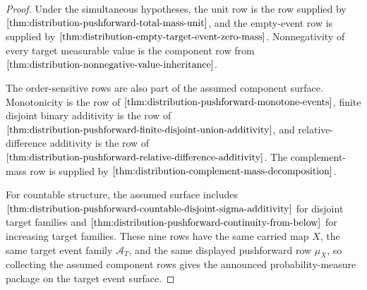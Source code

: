 \begin{proof}
Under the simultaneous hypotheses, the unit row is the row supplied by $\autoref{thm:distribution-pushforward-total-mass-unit}$, and the empty-event row is supplied by $\autoref{thm:distribution-empty-target-event-zero-mass}$. Nonnegativity of every target measurable value is the component row from $\autoref{thm:distribution-nonnegative-value-inheritance}$.

The order-sensitive rows are also part of the assumed component surface. Monotonicity is the row of $\autoref{thm:distribution-pushforward-monotone-events}$, finite disjoint binary additivity is the row of $\autoref{thm:distribution-pushforward-finite-disjoint-union-additivity}$, and relative-difference additivity is the row of $\autoref{thm:distribution-pushforward-relative-difference-additivity}$. The complement-mass row is supplied by $\autoref{thm:distribution-complement-mass-decomposition}$.

For countable structure, the assumed surface includes $\autoref{thm:distribution-pushforward-countable-disjoint-sigma-additivity}$ for disjoint target families and $\autoref{thm:distribution-pushforward-continuity-from-below}$ for increasing target families. These nine rows have the same carried map $X$, the same target event family $\mathcal A_T$, and the same displayed pushforward row $\mu_X$, so collecting the assumed component rows gives the announced probability-measure package on the target event surface.
\end{proof}



